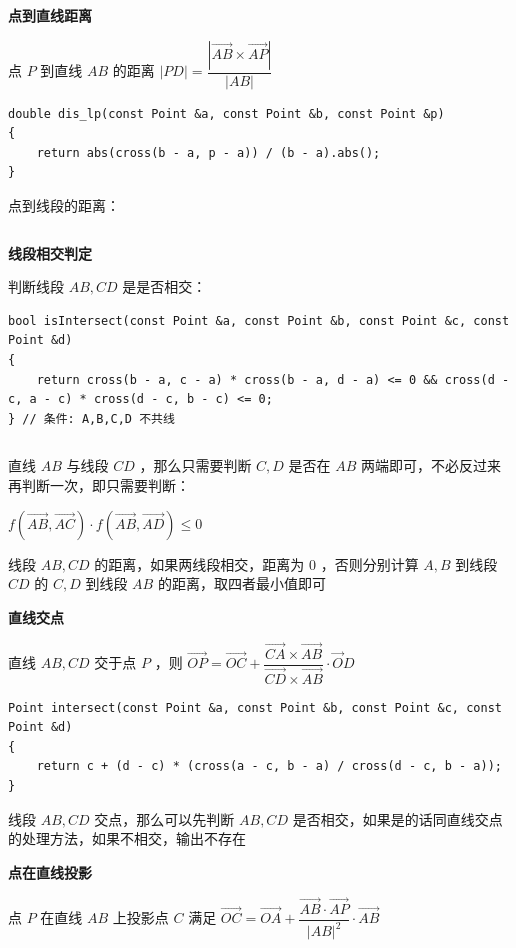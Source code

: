 \documentclass[twocolumn,10pt]{ctexart}
\makeatletter
\newcommand{\hfive}[1]{\par\addvspace{6pt}\@afterindentfalse
  {\noindent\bfseries\normalsize #1}\par\nobreak\vspace{2pt}}
\makeatother
\begin{document}
\hfive{点到直线距离}

点 $P$ 到直线 $AB$ 的距离 $|PD|=\dfrac{|\vec{AB}\times \vec{AP}|}{|AB|}$

\begin{verbatim}
double dis_lp(const Point &a, const Point &b, const Point &p)
{
    return abs(cross(b - a, p - a)) / (b - a).abs();
}
\end{verbatim}

点到线段的距离：

\inputminted{cpp}{code/ext_012.cpp}

\hfive{线段相交判定}

判断线段 $AB,CD$ 是是否相交：

\begin{verbatim}
bool isIntersect(const Point &a, const Point &b, const Point &c, const Point &d)
{
    return cross(b - a, c - a) * cross(b - a, d - a) <= 0 && cross(d - c, a - c) * cross(d - c, b - c) <= 0;
} // 条件: A,B,C,D 不共线
\end{verbatim}

\inputminted{cpp}{code/ext_013.cpp}

直线 $AB$ 与线段 $CD$ ，那么只需要判断 $C,D$ 是否在 $AB$ 两端即可，不必反过来再判断一次，即只需要判断：

\begin{adjustbox}{max width=\linewidth,center}
$f(\vec{AB},\vec{AC})\cdot f(\vec{AB},\vec{AD})\le 0$
\end{adjustbox}

线段 $AB,CD$ 的距离，如果两线段相交，距离为 $0$ ，否则分别计算 $A,B$ 到线段 $CD$ 的 $C,D$ 到线段 $AB$ 的距离，取四者最小值即可

\hfive{直线交点}

直线 $AB,CD$ 交于点 $P$  ，则 $\vec{OP}=\vec{OC}+\dfrac{\vec{CA}\times\vec{AB}}{\vec{CD}\times\vec{AB}}\cdot\vec OD$

\begin{verbatim}
Point intersect(const Point &a, const Point &b, const Point &c, const Point &d)
{
    return c + (d - c) * (cross(a - c, b - a) / cross(d - c, b - a));
}
\end{verbatim}

线段 $AB,CD$ 交点，那么可以先判断 $AB,CD$ 是否相交，如果是的话同直线交点的处理方法，如果不相交，输出不存在

\hfive{点在直线投影}

点 $P$ 在直线 $AB$ 上投影点 $C$ 满足 $\vec{OC}=\vec{OA}+\dfrac{\vec{AB}\cdot\vec{AP}}{|AB|^2}\cdot\vec{AB}$
\end{document}
